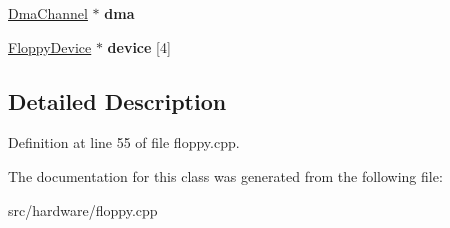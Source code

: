 \begin{DoxyCompactItemize}
\item 
\hypertarget{classFloppyController_a03a815344538d3ffe9b796369e87b86e}{\hyperlink{classDmaChannel}{Dma\-Channel} $\ast$ {\bfseries dma}}\label{classFloppyController_a03a815344538d3ffe9b796369e87b86e}

\item 
\hypertarget{classFloppyController_a37fba88fd67d407f6f42c8af12818d2a}{\hyperlink{classFloppyDevice}{Floppy\-Device} $\ast$ {\bfseries device} \mbox{[}4\mbox{]}}\label{classFloppyController_a37fba88fd67d407f6f42c8af12818d2a}

\end{DoxyCompactItemize}


\subsection{Detailed Description}


Definition at line 55 of file floppy.\-cpp.



The documentation for this class was generated from the following file\-:\begin{DoxyCompactItemize}
\item 
src/hardware/floppy.\-cpp\end{DoxyCompactItemize}
